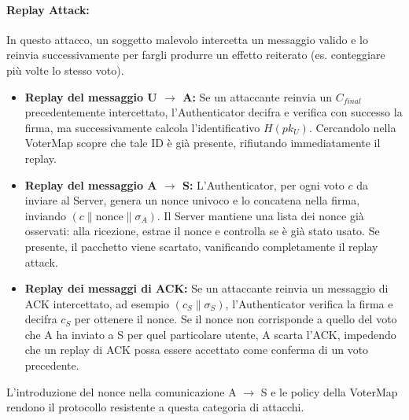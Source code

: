 \paragraph{Replay Attack:}
In questo attacco, un soggetto malevolo intercetta un messaggio valido e lo reinvia successivamente per fargli produrre un effetto reiterato (es. conteggiare più volte lo stesso voto).
\begin{itemize}
    \item \textbf{Replay del messaggio U $\rightarrow$ A:} Se un attaccante reinvia un $C_{final}$ precedentemente intercettato, l'Authenticator decifra e verifica con successo la firma, ma successivamente calcola l'identificativo $H(pk_U)$. Cercandolo nella VoterMap scopre che tale ID è già presente, rifiutando immediatamente il replay.
    \item \textbf{Replay del messaggio A $\rightarrow$ S:} L'Authenticator, per ogni voto $c$ da inviare al Server, genera un nonce univoco e lo concatena nella firma, inviando $(c \| \text{nonce} \| \sigma_A)$. Il Server mantiene una lista dei nonce già osservati: alla ricezione, estrae il nonce e controlla se è già stato usato. Se presente, il pacchetto viene scartato, vanificando completamente il replay attack.
    \item \textbf{Replay dei messaggi di ACK:} Se un attaccante reinvia un messaggio di ACK intercettato, ad esempio $(c_S \| \sigma_S)$, l'Authenticator verifica la firma e decifra $c_S$ per ottenere il nonce. Se il nonce non corrisponde a quello del voto che A ha inviato a S per quel particolare utente, A scarta l'ACK, impedendo che un replay di ACK possa essere accettato come conferma di un voto precedente. 
\end{itemize}
L'introduzione del nonce nella comunicazione A $\rightarrow$ S e le policy della VoterMap rendono il protocollo resistente a questa categoria di attacchi.

